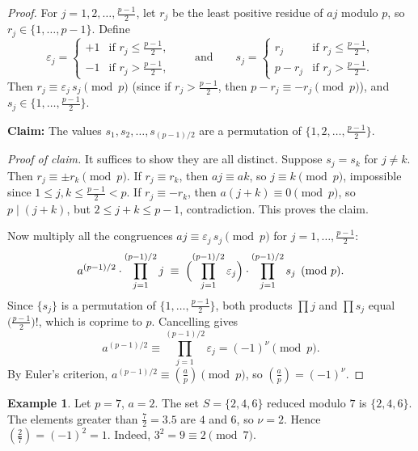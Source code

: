 \documentclass[12pt,a4paper,openany]{book}
\theoremstyle{definition}
\newtheorem{example}[definition]{Example}
\theoremstyle{plain}
\theoremstyle{remark}
\newcommand{\legendre}[2]{\left(\frac{#1}{#2}\right)}
\begin{document}
\begin{proof}
For $j = 1, 2, \ldots, \frac{p-1}{2}$, let $r_j$ be the least positive residue of $aj$
modulo $p$, so $r_j \in \{1, \ldots, p-1\}$.
Define
\[
  \varepsilon_j =
  \begin{cases}
    +1 & \text{if } r_j \leq \frac{p-1}{2},\\
    -1 & \text{if } r_j > \frac{p-1}{2},
  \end{cases}
  \qquad \text{and} \qquad
  s_j =
  \begin{cases}
    r_j     & \text{if } r_j \leq \frac{p-1}{2},\\
    p - r_j & \text{if } r_j > \frac{p-1}{2}.
  \end{cases}
\]
Then $r_j \equiv \varepsilon_j \, s_j \pmod{p}$ (since if $r_j > \frac{p-1}{2}$,
then $p - r_j \equiv -r_j \pmod{p}$), and $s_j \in \bigl\{1, \ldots, \frac{p-1}{2}\bigr\}$.

\medskip\noindent\textbf{Claim:} The values $s_1, s_2, \ldots, s_{(p-1)/2}$ are a permutation
of $\bigl\{1, 2, \ldots, \frac{p-1}{2}\bigr\}$.

\emph{Proof of claim.}
It suffices to show they are all distinct. Suppose $s_j = s_k$ for $j \neq k$.
Then $r_j \equiv \pm r_k \pmod{p}$. If $r_j \equiv r_k$, then $aj \equiv ak$,
so $j \equiv k \pmod{p}$, impossible since $1 \leq j, k \leq \frac{p-1}{2} < p$.
If $r_j \equiv -r_k$, then $a(j + k) \equiv 0 \pmod{p}$, so $p \mid (j + k)$,
but $2 \leq j + k \leq p - 1$, contradiction. This proves the claim.

\medskip
Now multiply all the congruences $aj \equiv \varepsilon_j \, s_j \pmod{p}$
for $j = 1, \ldots, \frac{p-1}{2}$:
\[
  a^{(p-1)/2} \cdot \prod_{j=1}^{(p-1)/2} j \;\equiv\;
  \Bigl(\prod_{j=1}^{(p-1)/2} \varepsilon_j\Bigr)
  \cdot \prod_{j=1}^{(p-1)/2} s_j
  \pmod{p}.
\]
Since $\{s_j\}$ is a permutation of $\bigl\{1, \ldots, \frac{p-1}{2}\bigr\}$,
both products $\prod j$ and $\prod s_j$ equal $\bigl(\frac{p-1}{2}\bigr)!$,
which is coprime to $p$. Cancelling gives
\[
  a^{(p-1)/2} \equiv \prod_{j=1}^{(p-1)/2} \varepsilon_j = (-1)^\nu \pmod{p}.
\]
By Euler's criterion, $a^{(p-1)/2} \equiv \legendre{a}{p} \pmod{p}$, so
$\legendre{a}{p} = (-1)^\nu$.
\end{proof}

\begin{example}
\label{ex:gauss-lemma-2mod7}
Let $p = 7$, $a = 2$. The set $S = \{2, 4, 6\}$ reduced modulo $7$ is $\{2, 4, 6\}$.
The elements greater than $\frac{7}{2} = 3.5$ are $4$ and $6$, so $\nu = 2$.
Hence $\legendre{2}{7} = (-1)^2 = 1$. Indeed, $3^2 = 9 \equiv 2 \pmod{7}$.
\end{example}
\end{document}
